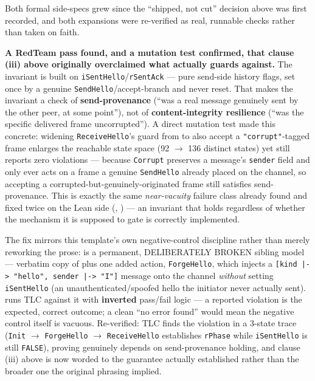 \documentclass[
  english,
]{article}
\theoremstyle{definition}
\begin{document}
Both formal side-specs grew since the ``shipped, not cut'' decision
above was first recorded, and both expansions were re-verified as real,
runnable checks rather than taken on faith.

\textbf{A RedTeam pass found, and a mutation test confirmed, that clause
(iii) above originally overclaimed what 
actually guards against.} The invariant is built on
\texttt{iSentHello}/\texttt{rSentAck} --- pure send-side history flags,
set once by a genuine \texttt{SendHello}/accept-branch and never reset.
That makes the invariant a check of \textbf{send-provenance} (``was a
real message genuinely sent by the other peer, at some point''), not of
\textbf{content-integrity resilience} (``was the specific delivered
frame uncorrupted''). A direct mutation test made this concrete:
widening \texttt{ReceiveHello}'s guard from 
to also accept a \texttt{"corrupt"}-tagged frame enlarges the reachable
state space (92 \texorpdfstring{\ensuremath{\to}}{->} 136 distinct states) yet 
still reports zero violations --- because \texttt{Corrupt} preserves a
message's \texttt{sender} field and only ever acts on a frame a genuine
\texttt{SendHello} already placed on the channel, so accepting a
corrupted-but-genuinely-originated frame still satisfies
send-provenance. This is exactly the same \emph{near-vacuity} failure
class already found and fixed twice on the Lean side
(,
) --- an invariant that holds
regardless of whether the mechanism it is supposed to gate is correctly
implemented.

The fix mirrors this template's own
 negative-control discipline
rather than merely reworking the prose:
 is a permanent,
DELIBERATELY BROKEN sibling model --- verbatim copy of
 plus one added action,
\texttt{ForgeHello}, which injects a
\texttt{{[}kind\ |{}-\textgreater{}\ "hello",\ sender\ |{}-\textgreater{}\ "I"{]}}
message onto the channel \emph{without} setting \texttt{iSentHello} (an
unauthenticated/spoofed hello the initiator never actually sent).
 runs TLC against it with
\textbf{inverted} pass/fail logic --- a reported violation is the
expected, correct outcome; a clean ``no error found'' would mean the
negative control itself is vacuous. Re-verified: TLC finds the violation
in a 3-state trace (\texttt{Init} \texorpdfstring{\ensuremath{\to}}{->} \texttt{ForgeHello} \texorpdfstring{\ensuremath{\to}}{->}
\texttt{ReceiveHello} establishes \texttt{rPhase} while
\texttt{iSentHello} is still \texttt{FALSE}), proving
 genuinely depends on send-provenance
holding, and clause (iii) above is now worded to the guarantee actually
established rather than the broader one the original phrasing implied.
\end{document}
